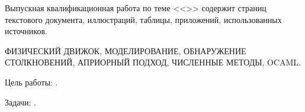 
Выпускная квалификационная работа по теме <<\Topic>> содержит
\pageref{LastPage} страниц текстового документа,
\TODO иллюстраций,
\TODO таблицы,
\TODO приложений,
 использованных источников.

\MakeUppercase{
    физический движок,
    моделирование,
    обнаружение столкновений,
    априорный подход,
    численные методы,
    OCaml.
}

Цель работы: \TODO.

Задачи: \TODO.

\TODO
